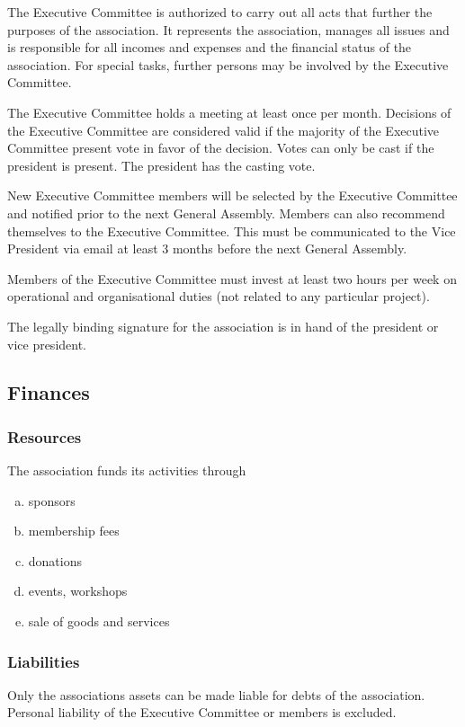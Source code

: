 \documentclass[12pt,a4paper,oneside]{article}
\newcounter{art}
\newcommand{\english}{    \switchcolumn[0]\noindent}
\begin{document}
\begin{paracol}{2}
	The Executive Committee is authorized to carry out all acts that further the purposes of the association. It represents the association, manages all issues and is responsible for all incomes and expenses and the financial status of the association. For special tasks, further persons may be involved by the Executive Committee. 

	The Executive Committee holds a meeting at least once per month. 
	Decisions of the Executive Committee are considered valid if the majority of the Executive Committee present vote in favor of the decision. Votes can only be cast if the president is present. The president has the casting vote.

	New Executive Committee members will be selected by the Executive Committee and notified prior to the next General Assembly. Members can also recommend themselves to the Executive Committee. This must be communicated to the Vice President via email at least 3 months before the next General Assembly.

	Members of the Executive Committee must invest at least two hours per week on operational and organisational duties (not related to any particular project).

	The legally binding signature for the association is in hand of the president or vice president.
 




\english
	\subsection{Finances}

	\english
	\subsubsection{Resources}
	The association funds its activities through 

	\begin{enumerate}[(a)]
	\item sponsors
	\item membership fees
	\item donations
	\item events, workshops
	\item sale of goods and services
	\end{enumerate}


	\english
	\subsubsection{Liabilities}
	Only the associations assets can be made liable for debts of the association. Personal liability of the Executive Committee or members is excluded.



\end{paracol}
\end{document}

